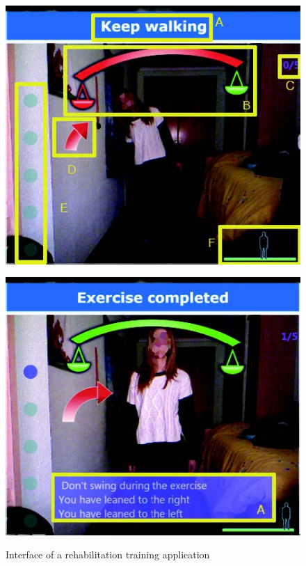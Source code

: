 \begin{figure}[htb]
	\centering
	\begin{minipage}[t]{0.46\linewidth}
		\centering
		\includegraphics[width=1\linewidth]{Pictures/informationUISurroundingObjects}
		\label{fig:informationUISurroundingObjects}
	\end{minipage}
	\hfill
	\begin{minipage}[t]{0.46\linewidth}
		\centering
		\includegraphics[width=1\linewidth]{Pictures/informationUIFeedbackSummary}
		\label{fig:informationUIFeedbackSummary}
	\end{minipage}
	\caption{Interface of a rehabilitation training application~\cite{Garrido2013-zs}}
	\label{fig:informationUIGarrido}
\end{figure}

